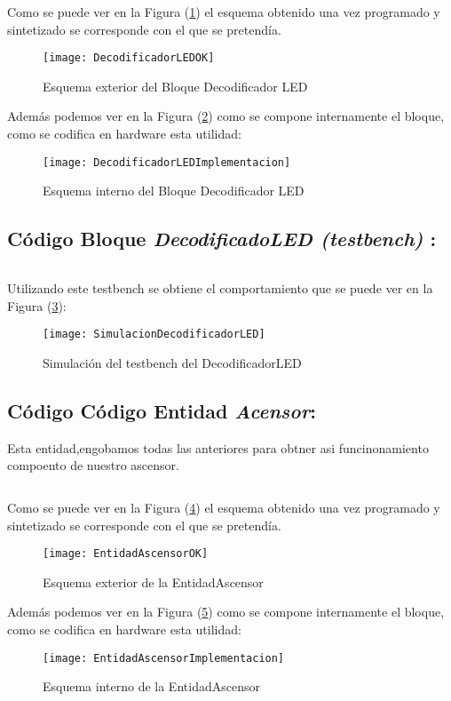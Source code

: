 	Como se puede ver en la Figura (\ref{fig:DecodificadorLEDOK}) el esquema obtenido una vez programado y sintetizado se corresponde con el que se pretendía.
    \begin{figure}[H]
		    \centering
		    \texttt{[image: DecodificadorLEDOK]}
		    \caption{Esquema exterior del Bloque Decodificador LED}
		    \label{fig:DecodificadorLEDOK}
	\end{figure}
    Además podemos ver en la Figura (\ref{fig:DecodificadorLEDImplementacion}) como se compone internamente el bloque, como se codifica en hardware esta utilidad:
    \begin{figure}[H]
		    \centering
		    \texttt{[image: DecodificadorLEDImplementacion]}
		    \caption{Esquema interno del Bloque Decodificador LED}
		    \label{fig:DecodificadorLEDImplementacion}
	\end{figure}
	
\subsection {Código Bloque \textit{DecodificadoLED (testbench)} :} \label{code:DecodificadorLED_tb}
	\inputminted[frame=lines,fontsize=\footnotesize,linenos]{vhdl}{CodeFiles/DecodificadorLED_tb.vhd}

    Utilizando este testbench se obtiene el comportamiento que se puede ver en la Figura (\ref{fig:SimulacionDecodificadorLED}):

    \begin{figure}[H]
		    \centering
		    \texttt{[image: SimulacionDecodificadorLED]}
		    \caption{Simulación del testbench del DecodificadorLED}
		    \label{fig:SimulacionDecodificadorLED}
	\end{figure}
\subsection{Código Código Entidad \textit{Acensor}:} \label{code:Acensor}
Esta entidad,engobamos todas las anteriores para obtner asi funcinonamiento compoento de nuestro ascensor. \\ 
	\inputminted[frame=lines,fontsize=\footnotesize,linenos]{vhdl}{CodeFiles/EntidadAscensor.vhd}

	Como se puede ver en la Figura (\ref{fig:EntidadAscensorOK}) el esquema obtenido una vez programado y sintetizado se corresponde con el que se pretendía.
    \begin{figure}[H]
		    \centering
		    \texttt{[image: EntidadAscensorOK]}
		    \caption{Esquema exterior de la EntidadAscensor}
		    \label{fig:EntidadAscensorOK}
	\end{figure}
    Además podemos ver en la Figura (\ref{fig:EntidadAscensorImplementacion}) como se compone internamente el bloque, como se codifica en hardware esta utilidad:
    \begin{figure}[H]
		    \centering
		    \texttt{[image: EntidadAscensorImplementacion]}
		    \caption{Esquema interno de la EntidadAscensor}
		    \label{fig:EntidadAscensorImplementacion}
	\end{figure}

